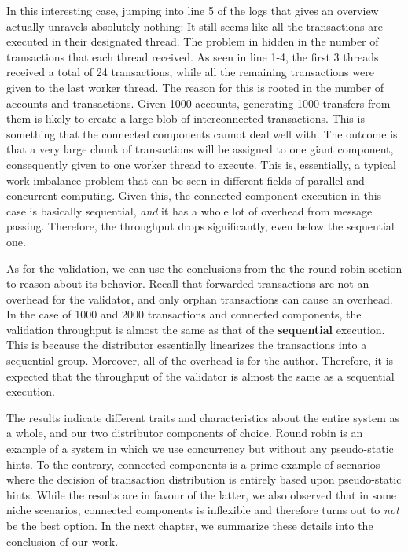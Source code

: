 	In this interesting case, jumping into line 5 of the logs that gives an overview actually
	unravels absolutely nothing: It still seems like all the transactions are executed in their
	designated thread. The problem in hidden in the number of transactions that each thread
	received. As seen in line 1-4, the first 3 threads received a total of 24 transactions, while
	all the remaining transactions were given to the last worker thread. The reason for this is
	rooted in the number of accounts and transactions. Given 1000 accounts, generating 1000
	transfers from them is likely to create a large blob of interconnected transactions. This is
	something that the connected components cannot deal well with. The outcome is that a very large
	chunk of transactions will be assigned to one giant component, consequently given to one worker
	thread to execute. This is, essentially, a typical work imbalance problem that can be seen in
	different fields of parallel and concurrent computing. Given this, the connected component
	execution in this case is basically sequential, \textit{and} it has a whole lot of overhead from
	message passing. Therefore, the throughput drops significantly, even below the sequential one.

	As for the validation, we can use the conclusions from the the round robin section to reason about its
	behavior. Recall that forwarded transactions are not an overhead for the validator, and only
	orphan transactions can cause an overhead. In the case of 1000 and 2000 transactions and
	connected components, the validation throughput is almost the same as that of the \textbf{sequential}
	execution. This is because the distributor essentially linearizes the transactions into a
	sequential group. Moreover, all of the overhead is for the author. Therefore, it is expected
	that the throughput of the validator is almost the same as a sequential execution.

The results indicate different traits and characteristics about the entire system as a whole, and
our two distributor components of choice. Round robin is an example of a system in which we use concurrency but without any pseudo-static hints. To the contrary, connected components is a prime example of scenarios where the decision of transaction distribution is entirely based upon pseudo-static hints. While the results are in favour of the latter, we also observed that in some niche scenarios, connected components is inflexible and therefore turns out to \textit{not} be the best option. In the next chapter, we summarize these details into the
conclusion of our work.

